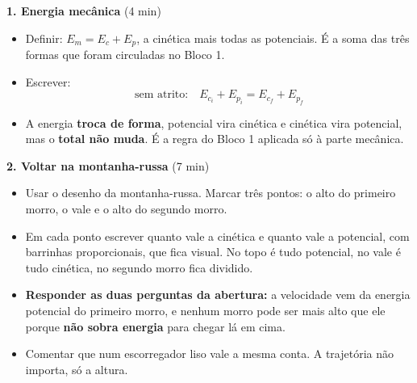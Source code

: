 \documentclass[11pt,a4paper]{article}
\begin{document}
\begin{quadro}
\textbf{1. Energia mec\^anica} (4 min)
\begin{itemize}[nosep]
  \item Definir: $E_m = E_c + E_p$, a cin\'etica mais todas as
        potenciais. \'E a soma das tr\^es formas que foram circuladas
        no Bloco 1.
  \item Escrever:
  \[
    \boxed{\text{sem atrito:}\quad
      E_{c_i} + E_{p_i} = E_{c_f} + E_{p_f}}
  \]
  \item A energia \textbf{troca de forma},
        potencial vira cin\'etica e cin\'etica vira potencial, mas o
        \textbf{total n\~ao muda}. \'E a regra do Bloco 1 aplicada s\'o
        \`a parte mec\^anica.
\end{itemize}

\medskip
\textbf{2. Voltar na montanha-russa} (7 min)
\begin{itemize}[nosep]
  \item Usar o desenho da montanha-russa. Marcar
        tr\^es pontos: o alto do primeiro morro, o vale e o alto do
        segundo morro.
  \item Em cada ponto escrever quanto vale a cin\'etica e quanto vale a
        potencial, com barrinhas proporcionais, que fica visual. No
        topo \'e tudo potencial, no vale \'e tudo cin\'etica, no
        segundo morro fica dividido.
  \item \textbf{Responder as duas perguntas da abertura:} a velocidade
        vem da energia potencial do primeiro morro, e nenhum morro pode
        ser mais alto que ele porque \textbf{n\~ao sobra energia} para
        chegar l\'a em cima.
  \item Comentar que num escorregador liso vale a mesma conta. A
        trajet\'oria n\~ao importa, s\'o a altura.
\end{itemize}


\end{quadro}
\end{document}
